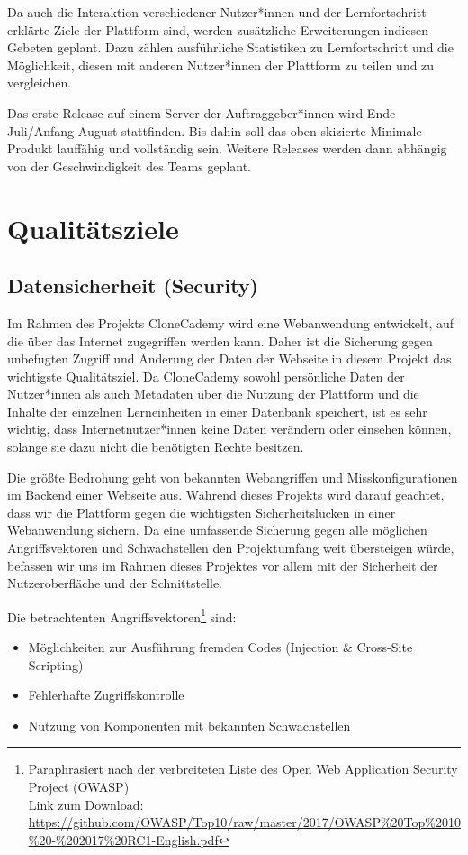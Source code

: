 \documentclass[accentcolor=tud0b,12pt,paper=a4]{tudreport}
\begin{document}
Da auch die Interaktion verschiedener Nutzer*innen und der Lernfortschritt erklärte Ziele der Plattform sind, werden zusätzliche Erweiterungen indiesen Gebeten geplant. Dazu zählen ausführliche Statistiken zu Lernfortschritt und die Möglichkeit, diesen mit anderen Nutzer*innen der Plattform zu teilen und zu vergleichen.

Das erste Release auf einem Server der Auftraggeber*innen wird Ende Juli/Anfang August stattfinden. Bis dahin soll das oben skizierte Minimale Produkt lauffähig und vollständig sein. Weitere Releases werden dann abhängig von der Geschwindigkeit des Teams geplant.


\chapter{Qualitätsziele}
\section{Datensicherheit (Security)}

Im Rahmen des Projekts CloneCademy wird eine Webanwendung entwickelt, auf die über das Internet zugegriffen werden kann. Daher ist die Sicherung gegen unbefugten Zugriff und Änderung der Daten der Webseite in diesem Projekt das wichtigste Qualitätsziel. Da CloneCademy sowohl persönliche Daten der Nutzer*innen als auch Metadaten über die Nutzung der Plattform und die Inhalte der einzelnen Lerneinheiten in einer Datenbank speichert, ist es sehr wichtig, dass Internetnutzer*innen keine Daten verändern oder einsehen können, solange sie dazu nicht die benötigten Rechte besitzen.

Die größte Bedrohung geht von bekannten Webangriffen und Misskonfigurationen im Backend einer Webseite aus. Während dieses Projekts wird darauf geachtet, dass wir die Plattform gegen die wichtigsten Sicherheitslücken in einer Webanwendung sichern. Da eine umfassende Sicherung gegen alle möglichen Angriffsvektoren und Schwachstellen den Projektumfang weit übersteigen würde, befassen wir uns im Rahmen dieses Projektes vor allem mit der Sicherheit der Nutzeroberfläche und der Schnittstelle.

Die betrachtenten Angriffsvektoren\footnote{Paraphrasiert nach der verbreiteten Liste des Open Web Application Security Project (OWASP)\\Link zum Download:  \href{https://github.com/OWASP/Top10/raw/master/2017/OWASP\%20Top\%2010\%20-\%202017\%20RC1-English.pdf}{https://github.com/OWASP/Top10/raw/master/2017/OWASP\%20Top\%2010\%20-\%202017\%20RC1-English.pdf}} sind:
\begin{itemize}
\item Möglichkeiten zur Ausführung fremden Codes (Injection \& Cross-Site Scripting)
\item Fehlerhafte Zugriffskontrolle
\item Nutzung von Komponenten mit bekannten Schwachstellen
\end{itemize}
\end{document}
